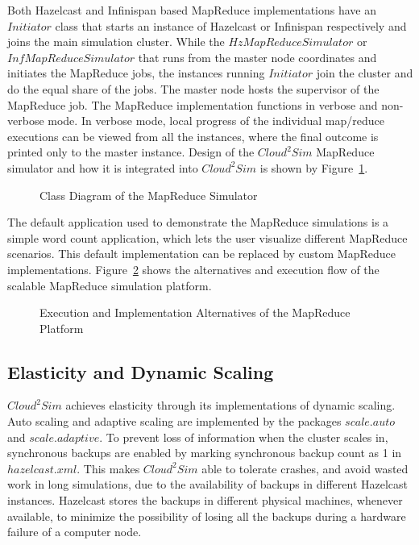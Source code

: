 Both Hazelcast and Infinispan based MapReduce implementations have an $Initiator$ class that starts an instance of Hazelcast or Infinispan respectively and joins the main simulation cluster. While the $HzMapReduceSimulator$ or $InfMapReduceSimulator$ that runs from the master node coordinates and initiates the MapReduce jobs, the instances running $Initiator$ join the cluster and do the equal share of the jobs. The master node hosts the supervisor of the MapReduce job. The MapReduce implementation functions in verbose and non-verbose mode. In verbose mode, local progress of the individual map/reduce executions can be viewed from all the instances, where the final outcome is printed only to the master instance. Design of the $Cloud^{2}Sim$ MapReduce simulator and how it is integrated into $Cloud^{2}Sim$ is shown by Figure~\ref{fig:mrclass}.
\begin{figure}[!htbp]
\begin{center}
\end{center}
 \caption{Class Diagram of the MapReduce Simulator}
 \label{fig:mrclass}
\end{figure}

The default application used to demonstrate the MapReduce simulations is a simple word count application, which lets the user visualize different MapReduce scenarios. This default implementation can be replaced by custom MapReduce implementations. Figure~\ref{fig:mrhi} shows the alternatives and execution flow of the scalable MapReduce simulation platform.
\begin{figure}[!htbp]
\begin{center}
\end{center}
 \caption{Execution and Implementation Alternatives of the MapReduce Platform}
 \label{fig:mrhi}
\end{figure}

\subsection{Elasticity and Dynamic Scaling}
$Cloud^{2}Sim$ achieves elasticity through its implementations of dynamic scaling. Auto scaling and adaptive scaling are implemented by the packages $scale.auto$ and $scale.adaptive$. To prevent loss of information when the cluster scales in, synchronous backups are enabled by marking synchronous backup count as 1 in $hazelcast.xml$. This makes $Cloud^{2}Sim$ able to tolerate crashes, and avoid wasted work in long simulations, due to the availability of backups in different Hazelcast instances. Hazelcast stores the backups in different physical machines, whenever available, to minimize the possibility of losing all the backups during a hardware failure of a computer node. 

